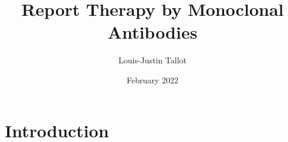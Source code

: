 \documentclass{article}
\title{Report Therapy by Monoclonal Antibodies}
\author{Louis-Justin Tallot}
\date{February 2022}
\begin{document}
\maketitle

\section{Introduction}
\end{document}
